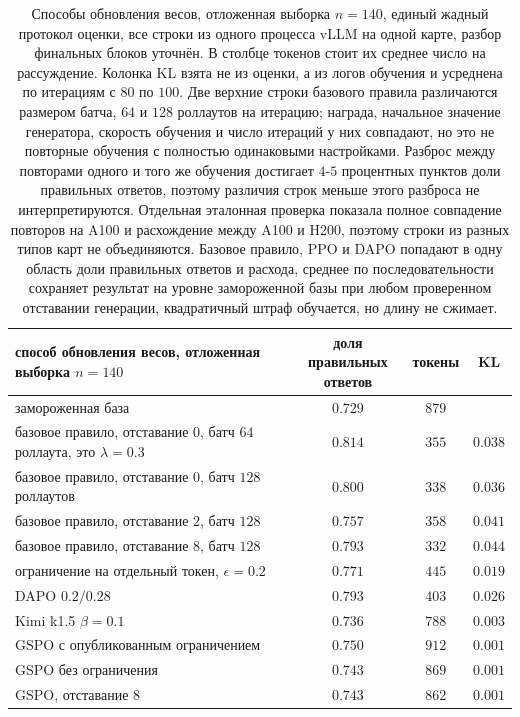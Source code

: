 \documentclass[11pt]{article}
\begin{document}
\begin{table}[t]
\centering
\begin{tabular}{lccc}
\toprule
способ обновления весов, отложенная выборка $n{=}140$ & \shortstack{доля правильных\\ответов} & токены & KL \\
\midrule
замороженная база                & $0.729$ & $879$ &  \\
\midrule
базовое правило, отставание $0$, батч $64$ роллаута, это $\lambda{=}0.3$ & $0.814$ & $355$ & $0.038$ \\
базовое правило, отставание $0$, батч $128$ роллаутов & $0.800$ & $338$ & $0.036$ \\
базовое правило, отставание $2$, батч $128$ & $0.757$ & $358$ & $0.041$ \\
базовое правило, отставание $8$, батч $128$ & $0.793$ & $332$ & $0.044$ \\
ограничение на отдельный токен, $\epsilon{=}0.2$ & $0.771$ & $445$ & $0.019$ \\
DAPO $0.2/0.28$                  & $0.793$ & $403$ & $0.026$ \\
Kimi k1.5 $\beta{=}0.1$          & $0.736$ & $788$ & $0.003$ \\
\midrule
GSPO с опубликованным ограничением & $0.750$ & $912$ & $0.001$ \\
GSPO без ограничения & $0.743$ & $869$ & $0.001$ \\
GSPO, отставание $8$ & $0.743$ & $862$ & $0.001$ \\
\bottomrule
\end{tabular}
\caption{Способы обновления весов, отложенная выборка $n{=}140$, единый жадный протокол оценки, все строки из одного процесса vLLM на одной карте, разбор финальных блоков уточнён. В столбце токенов стоит их среднее число на рассуждение. Колонка KL взята не из оценки, а из логов обучения и усреднена по итерациям с $80$ по $100$. Две верхние строки базового правила различаются размером батча, $64$ и $128$ роллаутов на итерацию; награда, начальное значение генератора, скорость обучения и число итераций у них совпадают, но это не повторные обучения с полностью одинаковыми настройками. Разброс между повторами одного и того же обучения достигает $4$-$5$ процентных пунктов доли правильных ответов, поэтому различия строк меньше этого разброса не интерпретируются. Отдельная эталонная проверка показала полное совпадение повторов на A100 и расхождение между A100 и H200, поэтому строки из разных типов карт не объединяются. Базовое правило, PPO и DAPO попадают в одну область доли правильных ответов и расхода, среднее по последовательности сохраняет результат на уровне замороженной базы при любом проверенном отставании генерации, квадратичный штраф обучается, но длину не сжимает.}
\label{tab:po}
\end{table}
\end{document}

